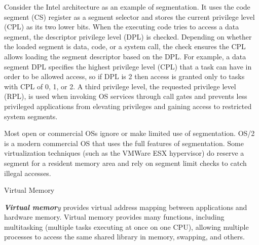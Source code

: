 \documentclass[12pt]{article}
\begin{document}
\begin{adjustwidth}{0.25in}{0.0in}
{\fontsize{16pt}{19.2pt}\selectfont Consider the Intel architecture as an example of segmentation. It uses the code segment (CS) register as a segment selector and stores the current privilege level (CPL) as its two lower bits. When the executing code tries to access a data segment, the descriptor privilege level (DPL) is checked. Depending on whether the loaded segment is data, code, or a system call, the check ensures the CPL allows loading the segment descriptor based on the DPL. For example, a data segment DPL specifies the highest privilege level (CPL) that a task can have in order to be allowed access, so if DPL is 2 then access is granted only to tasks with CPL of 0, 1, or 2. A third privilege level, the requested privilege level (RPL), is used when invoking OS services through call gates and prevents less privileged applications from elevating privileges and gaining access to restricted system segments.\par}\par

\end{adjustwidth}

\begin{adjustwidth}{0.25in}{0.0in}
{\fontsize{16pt}{19.2pt}\selectfont Most open or commercial OSs ignore or make limited use of segmentation. OS/2 is a modern commercial OS that uses the full features of segmentation. Some virtualization techniques (such as the VMWare ESX hypervisor) do reserve a segment for a resident memory area and rely on segment limit checks to catch illegal accesses.\par}\par

\end{adjustwidth}


\vspace{\baselineskip}

\vspace{\baselineskip}
\begin{adjustwidth}{0.25in}{0.0in}
{\fontsize{18pt}{21.6pt}\selectfont Virtual Memory\par}\par

\end{adjustwidth}

\begin{adjustwidth}{0.25in}{0.0in}
{\fontsize{16pt}{19.2pt}\selectfont \textbf{\textit{Virtual memor}}\textit{y} provides virtual address mapping between applications and hardware memory. Virtual memory provides many functions, including multitasking (multiple tasks executing at once on one CPU), allowing multiple processes to access the same shared library in memory, swapping, and others.\par}\par

\end{adjustwidth}
\end{document}
